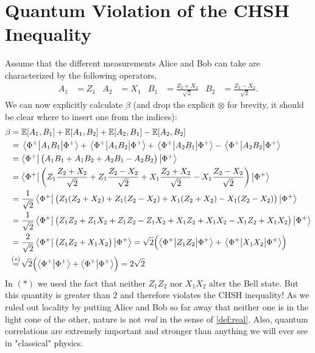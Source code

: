 	\section{Quantum Violation of the CHSH Inequality}
		Assume that the different measurements Alice and Bob can take are characterized by the following operators,
		\begin{align}
			A_1 &= Z_1 &
			A_2 &= X_1 &
			B_1 &= \frac{Z_2 + X_2}{\sqrt{2}} &
			B_2 &= \frac{Z_2 - X_2}{\sqrt{2}}.
		\end{align}
		We can now explicitly calculate \(\beta\) (and drop the explicit \(\otimes\) for brevity, it should be clear where to insert one from the indices):
		\begin{align}
			\beta
				&= \E[A_1, B_1] + \E[A_1, B_2] + \E[A_2, B_1] - \E[A_2, B_2] \\
				&= \mel{\Phi^+}{A_1 B_1}{\Phi^+} + \mel{\Phi^+}{A_1 B_2}{\Phi^+} + \mel{\Phi^+}{A_2 B_1}{\Phi^+} - \mel{\Phi^+}{A_2 B_2}{\Phi^+} \\
				&= \bra{\Phi^+} \bigl( A_1 B_1 + A_1 B_2 + A_2 B_1 - A_2 B_2 \bigr) \ket{\Phi^+} \\
				&= \bra{\Phi^+} \biggl( Z_1 \frac{Z_2 + X_2}{\sqrt{2}} + Z_1 \frac{Z_2 - X_2}{\sqrt{2}} + X_1 \frac{Z_2 + X_2}{\sqrt{2}} - X_1 \frac{Z_2 - X_2}{\sqrt{2}} \biggr) \ket{\Phi^+} \\
				&= \frac{1}{\sqrt{2}} \bra{\Phi^+} \bigl( Z_1 (Z_2 + X_2) + Z_1 (Z_2 - X_2) + X_1 (Z_2 + X_2) - X_1 (Z_2 - X_2) \bigr) \ket{\Phi^+} \\
				&= \frac{1}{\sqrt{2}} \bra{\Phi^+} \bigl( Z_1 Z_2 + Z_1 X_2 + Z_1 Z_2 - Z_1 X_2 + X_1 Z_2 + X_1 X_2 - X_1 Z_2 + X_1 X_2 \bigr) \ket{\Phi^+} \\
				&= \frac{2}{\sqrt{2}} \bra{\Phi^+} \bigl( Z_1 Z_2 + X_1 X_2 \bigr) \ket{\Phi^+}
				 = \sqrt{2} \Bigl(\! \mel{\Phi^+}{Z_1 Z_2}{\Phi^+} + \mel{\Phi^+}{X_1 X_2}{\Phi^+} \Bigr) \\
				&\overset{\mathclap{(\ast)}}{=} \sqrt{2} \Bigl( \ip{\Phi^+}{\Phi^+} + \ip{\Phi^+}{\Phi^+} \Bigr)
				 = 2 \sqrt{2}
		\end{align}
		In \((\ast)\) we used the fact that neither \(Z_1 Z_2\) nor \(X_1 X_2\) alter the Bell state. But this quantity is greater than \(2\) and therefore violates the CHSH inequality! As we ruled out locality by putting Alice and Bob so far away that neither one is in the light cone of the other, nature is not \emph{real} in the sense of \autoref{def:real}. Also, quantum correlations are extremely important and stronger than anything we will ever see in "classical" physics.

